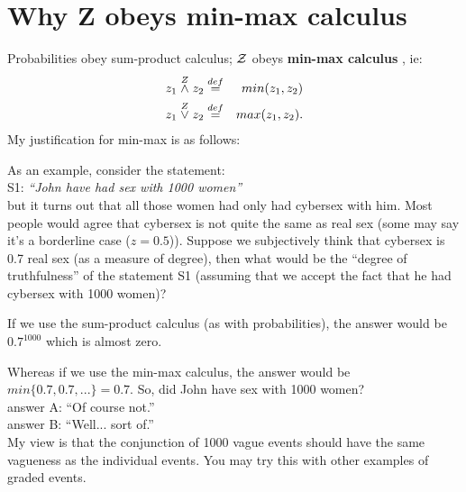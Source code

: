\section{Why Z obeys min-max calculus}
\label{sec:min-max-VS-sum-product}

Probabilities obey sum-product calculus;  $\mathcal{Z}$ obeys \textbf{min-max calculus} \citep*{Zadeh1965}, ie:
\begin{eqnarray}
z_1 \stackrel{Z}{\wedge} z_2    & \stackrel{def}{=} &  min(z_1, z_2) \\
z_1 \stackrel{Z}{\vee}   z_2    & \stackrel{def}{=} &  max(z_1, z_2).
\end{eqnarray}
My justification for min-max is as follows:

As an example, consider the statement:\\
\hspace*{1cm} S1: \textit{``John have had sex with 1000 women''}\\
but it turns out that all those women had only had cybersex with him.  Most people would agree that cybersex is not quite the same as real sex (some may say it's a borderline case ($z=0.5$)).  Suppose we subjectively think that cybersex is 0.7 real sex (as a measure of degree), then what would be the ``degree of truthfulness'' of the statement S1 (assuming that we accept the fact that he had cybersex with 1000 women)?

If we use the sum-product calculus (as with probabilities), the answer would be $ 0.7^{1000} $ which is almost zero.

Whereas if we use the min-max calculus, the answer would be $min\{0.7, 0.7, ...\} = 0.7$.  So, did John have sex with 1000 women?\\
\hspace*{1cm} answer A:  ``Of course not.''\\
\hspace*{1cm} answer B:  ``Well... sort of.''\\
My view is that the conjunction of 1000 vague events should have the same vagueness as the individual events.  You may try this with other examples of graded events.


